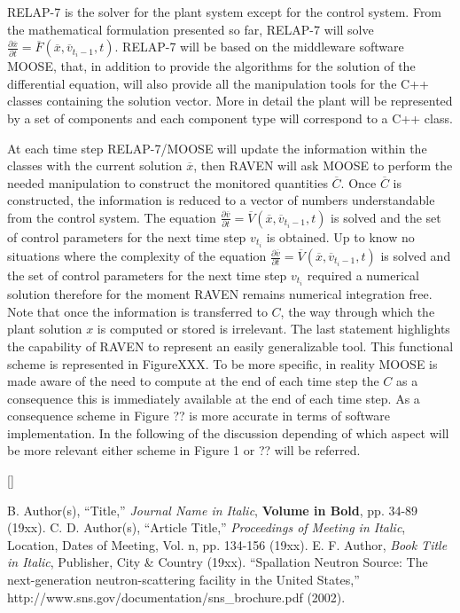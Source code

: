 \documentclass{mc2013}
\begin{document}
RELAP-7 is the solver for the plant system except for the control system. From the mathematical
formulation presented so far, RELAP-7 will solve 
$\frac{\partial \overline{x}}{\partial t} = \overline{F}(\overline{x},\overline{v}_{t_{i}-1},t)$.
RELAP-7 will be based on the middleware software MOOSE, that, in addition to provide the algorithms for the solution of the differential equation, will also provide all the manipulation tools for the C++ classes containing the solution vector. More in detail the plant will be represented by a set of components and each component type will correspond to a C++ class.

At each time step RELAP-7/MOOSE will update the information within the classes with the current solution  $\overline{x}$, then RAVEN will ask MOOSE to perform the needed manipulation to construct the monitored quantities $\overline{C}$. Once $\overline{C}$ is constructed, the information is reduced to a vector of
numbers understandable from the control system. The equation 
$\frac{\partial \overline{v}}{\partial t} = \overline{V}(\overline{x},\overline{v}_{t_{i}-1},t) $
is solved and the set of control parameters for the next time step $v_{t_{i}}$ is obtained. 
Up to know no situations where the complexity of the equation 
$\frac{\partial \overline{v}}{\partial t} = \overline{V}(\overline{x},\overline{v}_{t_{i}-1},t) $
is solved and the set of control parameters for the next time step $v_{t_{i}}$ required a numerical solution therefore for the moment RAVEN remains numerical integration free. 
Note that once the information is transferred to $C$, the way through which the plant
solution $x$ is computed or stored is irrelevant. The last statement highlights the capability of RAVEN to
represent an easily generalizable tool. This functional scheme is represented in FigureXXX. 
To be more specific, in reality MOOSE is made aware of the need to compute at the end of each time step the $C$ as a consequence this is immediately available at the end of each time step. As a consequence scheme in Figure ?? is more accurate in terms of software implementation. In the following of the discussion depending of which aspect will be more relevant either scheme in Figure 1 or ?? will be referred.



[]


\setlength{\baselineskip}{12pt}
\begin{thebibliography}{300}
 B. Author(s), ``Title,'' {\it Journal Name in Italic}, 
          {\bf Volume in Bold}, pp. 34-89 (19xx).
 C. D. Author(s), ``Article Title,'' {\it Proceedings of
          Meeting in Italic}, Location, Dates of Meeting, Vol. n, pp. 134-156 
          (19xx).
 E. F. Author, {\it Book Title in Italic}, Publisher, City \&
          Country (19xx). 
 ``Spallation Neutron Source: The next-generation 
          neutron-scattering facility in the United States,'' 
          http://www.sns.gov/documentation/sns\_brochure.pdf (2002).
\end{thebibliography}
\end{document}

